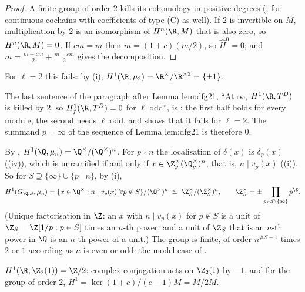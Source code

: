 \begin{proof}
A finite group of order $2$ kills its cohomology in positive degrees (; for continuous cochains with coefficients of type (C) as well). If $2$ is
invertible on $M$, multiplication by $2$ is an isomorphism of $H^n(\R,M)$ that is also zero, so $H^n(\R,M)=0$. If $cm=m$ then $m=(1+c)(m/2)$, so $\hat H^0=0$; and
$m=\frac{m+cm}2+\frac{m-cm}2$ gives the decomposition.
\end{proof}

\noindent For $\ell=2$ this fails: by (i), $H^1(\R,\mu_2)=\R^\times/\R^{\times2}=\{\pm1\}$.

\begin{paperlink}\label{pl:galcoh:real}
The last sentence of the paragraph after Lemma lem:dfg21, ``At $\infty$, $H^1(\R,T^D)$ is killed by $2$, so $H^1_f(\R,T^D)=0$ for $\ell$ odd'', is
: the first half holds for every module, the second needs $\ell$ odd, and  shows that it fails for $\ell=2$. The
summand $p=\infty$ of the sequence of Lemma lem:dfg21 is therefore $0$.
\end{paperlink}

\begin{example}\label{ex:galcoh:global-kummer}
By , $H^1(\Q,\mu_n)=\Q^\times/(\Q^\times)^n$. For $p\nmid n$ the localisation of $\delta(x)$ is $\delta_p(x)$ ((iv)), which is
unramified if and only if $x\in\Z_p^\times(\Q_p^\times)^n$, that is, $n\mid v_p(x)$ ((i)). So for $S\supseteq\{\infty\}\cup\{p\mid n\}$, by
(i),
\[
H^1(G_{\Q,S},\mu_n)=\{x\in\Q^\times:n\mid v_p(x)\ \forall p\notin S\}/(\Q^\times)^n\;\simeq\;\Z_S^\times/(\Z_S^\times)^n,\qquad\Z_S^\times=\pm\prod_{p\in S\setminus\{\infty\}}p^{\Z}.
\]
(Unique factorisation in $\Z$: an $x$ with $n\mid v_p(x)$ for $p\notin S$ is a unit of $\Z_S=\Z[1/p:p\in S]$ times an $n$-th power, and a unit of $\Z_S$ that is an $n$-th power in
$\Q$ is an $n$-th power of a unit.) The group is finite, of order $n^{\#S-1}$ times $2$ or $1$ according as $n$ is even or odd: the model case of
.
\end{example}

\begin{example}\label{ex:galcoh:real-two}
$H^1(\R,\Z_2(1))=\Z/2$: complex conjugation acts on $\Z_2(1)$ by $-1$, and for the group of order $2$, $H^1=\ker(1+c)/(c-1)M=M/2M$.
\end{example}


